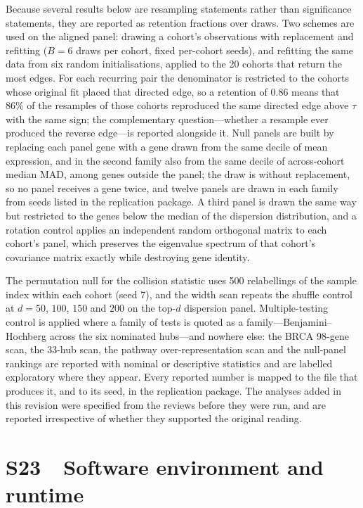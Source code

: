 \documentclass[11pt]{article}
\begin{document}
Because several results below are resampling statements rather than significance statements, they are reported as retention fractions over draws. Two schemes are used on the aligned panel: drawing a cohort's observations with replacement and refitting ($B = 6$ draws per cohort, fixed per-cohort seeds), and refitting the same data from six random initialisations, applied to the 20 cohorts that return the most edges. For each recurring pair the denominator is restricted to the cohorts whose original fit placed that directed edge, so a retention of $0.86$ means that 86\% of the resamples of those cohorts reproduced the same directed edge above $\tau$ with the same sign; the complementary question---whether a resample ever produced the reverse edge---is reported alongside it. Null panels are built by replacing each panel gene with a gene drawn from the same decile of mean expression, and in the second family also from the same decile of across-cohort median MAD, among genes outside the panel; the draw is without replacement, so no panel receives a gene twice, and twelve panels are drawn in each family from seeds listed in the replication package. A third panel is drawn the same way but restricted to the genes below the median of the dispersion distribution, and a rotation control applies an independent random orthogonal matrix to each cohort's panel, which preserves the eigenvalue spectrum of that cohort's covariance matrix exactly while destroying gene identity.

The permutation null for the collision statistic uses 500 relabellings of the sample index within each cohort (seed 7), and the width scan repeats the shuffle control at $d = 50$, $100$, $150$ and $200$ on the top-$d$ dispersion panel. Multiple-testing control is applied where a family of tests is quoted as a family---Benjamini--Hochberg across the six nominated hubs---and nowhere else: the BRCA 98-gene scan, the 33-hub scan, the pathway over-representation scan and the null-panel rankings are reported with nominal or descriptive statistics and are labelled exploratory where they appear. Every reported number is mapped to the file that produces it, and to its seed, in the replication package. The analyses added in this revision were specified from the reviews before they were run, and are reported irrespective of whether they supported the original reading.

\section*{S23\ \ Software environment and runtime}
\end{document}
